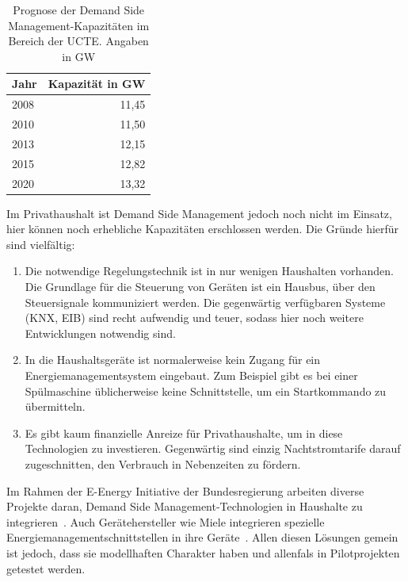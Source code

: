 \documentclass[12pt,BCOR=8.5mm]{scrartcl}
\begin{document}
\begin{table}
  \centering
  \begin{tabular}{|l|r|}
    \hline
    Jahr & Kapazität in GW \\
    \hline
    2008 & 11,45\\
    2010 & 11,50\\
    2013 & 12,15 \\
    2015 & 12,82 \\
    2020 & 13,32 \\
    \hline
  \end{tabular}
  \caption{Prognose der Demand Side Management-Kapazitäten im Bereich
  der UCTE. Angaben in GW}
  \label{tab:drforecast}
\end{table}

Im Privathaushalt ist Demand Side Management jedoch noch nicht im
Einsatz, hier können noch erhebliche Kapazitäten erschlossen werden. Die
Gründe hierfür sind vielfältig: 

\begin{enumerate}
  \item Die notwendige Regelungstechnik ist in nur wenigen Haushalten
    vorhanden. Die Grundlage für die Steuerung von Geräten ist ein
    Hausbus, über den Steuersignale kommuniziert werden. Die gegenwärtig
    verfügbaren Systeme (KNX, EIB) sind recht aufwendig und teuer,
    sodass hier noch weitere Entwicklungen notwendig sind.
  \item In die Haushaltsgeräte ist normalerweise kein Zugang für ein
    Energiemanagementsystem eingebaut. Zum Beispiel gibt es bei einer
    Spülmaschine üblicherweise keine Schnittstelle, um ein Startkommando
    zu übermitteln.
  \item Es gibt kaum finanzielle Anreize für Privathaushalte, um in
    diese Technologien zu investieren. Gegenwärtig sind einzig
    Nachtstromtarife darauf zugeschnitten, den Verbrauch in Nebenzeiten
    zu fördern.
\end{enumerate}


Im Rahmen der E-Energy Initiative der Bundesregierung arbeiten diverse
Projekte daran, Demand Side Management-Technologien in Haushalte zu
integrieren~\cite{web:e-energy}. Auch Gerätehersteller wie Miele
integrieren spezielle Energiemanagementschnittstellen in ihre
Geräte~\cite{miele10ifapresse}. Allen diesen Lösungen gemein ist jedoch,
dass sie modellhaften Charakter haben und allenfals in Pilotprojekten
getestet werden.
\end{document}
